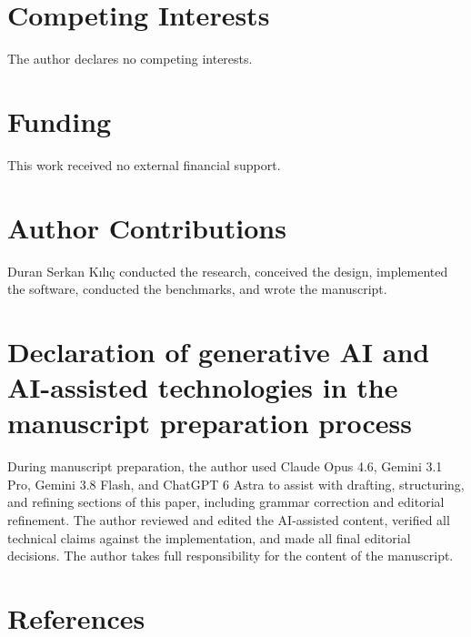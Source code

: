 \documentclass[fleqn,10pt,lineno]{wlpeerj}
\begin{document}
\section{Competing Interests}\label{competing-interests}

The author declares no competing interests.

\section{Funding}\label{funding}

This work received no external financial support.

\section{Author Contributions}\label{author-contributions}

Duran Serkan Kılıç conducted the research, conceived the design,
implemented the software, conducted the benchmarks, and wrote the
manuscript.

\section{Declaration of generative AI and AI-assisted technologies in
the manuscript preparation
process}\label{declaration-of-generative-ai-and-ai-assisted-technologies-in-the-manuscript-preparation-process}

During manuscript preparation, the author used Claude Opus 4.6, Gemini
3.1 Pro, Gemini 3.8 Flash, and ChatGPT 6 Astra to assist with drafting,
structuring, and refining sections of this paper, including grammar
correction and editorial refinement. The author reviewed and edited the
AI-assisted content, verified all technical claims against the
implementation, and made all final editorial decisions. The author takes
full responsibility for the content of the manuscript.

\newpage

\section*{References}\label{references}
\end{document}
